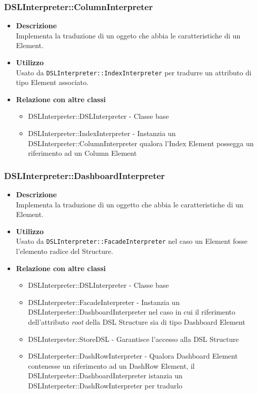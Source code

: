 \subsubsection{DSLInterpreter::ColumnInterpreter}
\begin{itemize}
\item \textbf{Descrizione} \hfill \\
Implementa la traduzione di un oggeto che abbia le caratteristiche di un  Element.
\item \textbf{Utilizzo} \hfill \\
Usato da \texttt{DSLInterpreter::IndexInterpreter} per tradurre un attributo di tipo  Element associato.
\item \textbf{Relazione con altre classi}
\begin{itemize}
\item DSLInterpreter::DSLInterpreter - Classe base
\item DSLInterpreter::IndexInterpreter - Instanzia un DSLInterpreter::ColumnInterpreter qualora l'Index Element possegga un riferimento ad un Column Element
\end{itemize}
\end{itemize}

\subsubsection{DSLInterpreter::DashboardInterpreter}
\begin{itemize}
\item \textbf{Descrizione} \hfill \\
Implementa la traduzione di un oggetto che abbia le caratteristiche di un  Element.
\item \textbf{Utilizzo} \hfill \\
Usato da \texttt{DSLInterpreter::FacadeInterpreter} nel caso un  Element fosse l'elemento radice del  Structure. 
\item \textbf{Relazione con altre classi}
\begin{itemize}
\item DSLInterpreter::DSLInterpreter - Classe base
\item DSLInterpreter::FacadeInterpreter - Instanzia un DSLInterpreter::DashboardInterpreter nel caso in cui il riferimento dell'attributo \textit{root} della DSL Structure sia di tipo Dashboard Element 
\item DSLInterpreter::StoreDSL - Garantisce l'accesso alla DSL Structure
\item DSLInterpreter::DashRowInterpreter - Qualora Dashboard Element contenesse un riferimento ad un DashRow Element, il DSLInterpreter::DashboardInterpreter istanzia un DSLInterpreter::DashRowInterpreter per tradurlo
\end{itemize}
\end{itemize}

